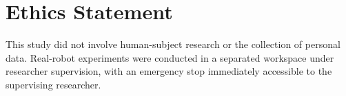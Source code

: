 \section*{Ethics Statement}

This study did not involve human-subject research or the collection of personal data. Real-robot experiments were conducted in a separated workspace under researcher supervision, with an emergency stop immediately accessible to the supervising researcher.
